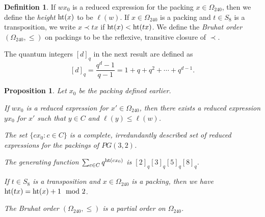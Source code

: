 \documentclass{amsart}
\theoremstyle{plain}
\newtheorem{prop}[theorem]{Proposition}
\theoremstyle{definition}
\newtheorem{defn}[theorem]{Definition}
\theoremstyle{remark}
\numberwithin{equation}{section}
\newcommand{\rootht}{\text{\rm ht}}
\newcommand{\qpx}{\Omega_{240}}
\begin{document}
\begin{defn}\label{def:theorder}
If $wx_0$ is a reduced expression for the packing $x \in \qpx$, then we define the {\it height} $\rootht(x)$ 
to be $\ell(w)$. If $x \in \qpx$ is a packing and $t \in S_8$ is a transposition, we write $x \prec tx$ if 
$\rootht(x) < \rootht(tx)$.
We define the {\it Bruhat order} $(\qpx, \leq)$ on packings to be the reflexive, transitive closure of $\prec$.
\end{defn}

The quantum integers $[d]_q$ in the next result are defined as $$
[d]_q = \frac{q^d-1}{q-1} = 1 + q + q^2 + \cdots + q^{d-1}
.$$

\begin{prop}\label{prop:combo}
Let $x_0$ be the packing defined earlier.
\item[{\rm (i)}]{If $wx_0$ is a reduced expression for $x' \in \qpx$, then there exists a reduced expression 
$y x_0$ for $x'$ such that $y \in C$ and $\ell(y) \leq \ell(w)$.}
\item[{\rm (ii)}]{The set $\{cx_0 : c \in C\}$ is a complete, irredundantly described set of reduced expressions 
for the packings of $PG(3, 2)$.}
\item[{\rm (iii)}]{The generating function $\sum_{c \in C} q^{\rootht(cx_0)}$ is 
$[2]_q [3]_q [5]_q [8]_q$.}
\item[{\rm (iv)}]{If $t \in S_8$ is a transposition and $x \in \qpx$ is a packing, then we have 
$\rootht(tx) = \rootht(x) + 1 \mod 2$.}
\item[{\rm (v)}]{The Bruhat order $(\qpx, \leq)$ is a partial order on $\qpx$.}
\end{prop}
\end{document}
